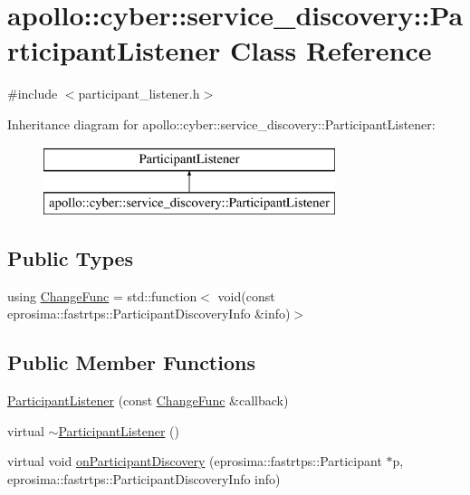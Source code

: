 \hypertarget{classapollo_1_1cyber_1_1service__discovery_1_1ParticipantListener}{\section{apollo\-:\-:cyber\-:\-:service\-\_\-discovery\-:\-:Participant\-Listener Class Reference}
\label{classapollo_1_1cyber_1_1service__discovery_1_1ParticipantListener}
}


{\ttfamily \#include $<$participant\-\_\-listener.\-h$>$}

Inheritance diagram for apollo\-:\-:cyber\-:\-:service\-\_\-discovery\-:\-:Participant\-Listener\-:\begin{figure}[H]
\begin{center}
\leavevmode
\includegraphics[height=2.000000cm]{classapollo_1_1cyber_1_1service__discovery_1_1ParticipantListener}
\end{center}
\end{figure}
\subsection*{Public Types}
\begin{DoxyCompactItemize}
\item 
using \hyperlink{classapollo_1_1cyber_1_1service__discovery_1_1ParticipantListener_aeb34c3abc88e4f17c1954756e9f2b8db}{Change\-Func} = std\-::function$<$ void(const eprosima\-::fastrtps\-::\-Participant\-Discovery\-Info \&info)$>$
\end{DoxyCompactItemize}
\subsection*{Public Member Functions}
\begin{DoxyCompactItemize}
\item 
\hyperlink{classapollo_1_1cyber_1_1service__discovery_1_1ParticipantListener_afafab55249cfd837187ff60f658bd513}{Participant\-Listener} (const \hyperlink{classapollo_1_1cyber_1_1service__discovery_1_1ParticipantListener_aeb34c3abc88e4f17c1954756e9f2b8db}{Change\-Func} \&callback)
\item 
virtual \hyperlink{classapollo_1_1cyber_1_1service__discovery_1_1ParticipantListener_a5744b2e997460e2c19dd78c9729bf93b}{$\sim$\-Participant\-Listener} ()
\item 
virtual void \hyperlink{classapollo_1_1cyber_1_1service__discovery_1_1ParticipantListener_a86f23dfd64617a447da7c9772767e901}{on\-Participant\-Discovery} (eprosima\-::fastrtps\-::\-Participant $\ast$p, eprosima\-::fastrtps\-::\-Participant\-Discovery\-Info info)
\end{DoxyCompactItemize}
